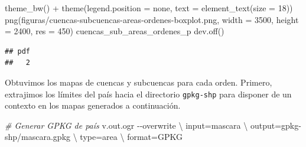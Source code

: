 \documentclass[spanish]{article}
\newenvironment{Shaded}{\begin{snugshade}}{\end{snugshade}}
\newcommand{\AttributeTok}[1]{\textcolor[rgb]{0.77,0.63,0.00}{#1}}
\newcommand{\CommentTok}[1]{\textcolor[rgb]{0.56,0.35,0.01}{\textit{#1}}}
\newcommand{\DataTypeTok}[1]{\textcolor[rgb]{0.13,0.29,0.53}{#1}}
\newcommand{\DecValTok}[1]{\textcolor[rgb]{0.00,0.00,0.81}{#1}}
\newcommand{\ExtensionTok}[1]{#1}
\newcommand{\FunctionTok}[1]{\textcolor[rgb]{0.00,0.00,0.00}{#1}}
\newcommand{\NormalTok}[1]{#1}
\newcommand{\SpecialCharTok}[1]{\textcolor[rgb]{0.00,0.00,0.00}{#1}}
\newcommand{\StringTok}[1]{\textcolor[rgb]{0.31,0.60,0.02}{#1}}
\begin{document}
\begin{Shaded}
\begin{Highlighting}[]
  \FunctionTok{theme\_bw}\NormalTok{() }\SpecialCharTok{+}
  \FunctionTok{theme}\NormalTok{(}\AttributeTok{legend.position =} \StringTok{\textquotesingle{}none\textquotesingle{}}\NormalTok{, }\AttributeTok{text =} \FunctionTok{element\_text}\NormalTok{(}\AttributeTok{size =} \DecValTok{18}\NormalTok{))}
\FunctionTok{png}\NormalTok{(}\StringTok{\textquotesingle{}figuras/cuencas{-}subcuencas{-}areas{-}ordenes{-}boxplot.png\textquotesingle{}}\NormalTok{,}
    \AttributeTok{width =} \DecValTok{3500}\NormalTok{, }\AttributeTok{height =} \DecValTok{2400}\NormalTok{, }\AttributeTok{res =} \DecValTok{450}\NormalTok{)}
\NormalTok{cuencas\_sub\_areas\_ordenes\_p}
\FunctionTok{dev.off}\NormalTok{()}
\end{Highlighting}
\end{Shaded}

\begin{verbatim}
## pdf 
##   2
\end{verbatim}

Obtuvimos los mapas de cuencas y subcuencas para cada orden. Primero,
extrajimos los límites del país hacia el directorio \texttt{gpkg-shp}
para disponer de un contexto en los mapas generados a continuación.

\begin{Shaded}
\begin{Highlighting}[]
\CommentTok{\# Generar GPKG de país}
\ExtensionTok{v.out.ogr} \AttributeTok{{-}{-}overwrite} \DataTypeTok{\textbackslash{}}
\NormalTok{  input=mascara }\DataTypeTok{\textbackslash{}}
\NormalTok{  output=gpkg{-}shp/mascara.gpkg }\DataTypeTok{\textbackslash{}}
\NormalTok{  type=area }\DataTypeTok{\textbackslash{}}
\NormalTok{  format=GPKG}
\end{Highlighting}
\end{Shaded}
\end{document}

